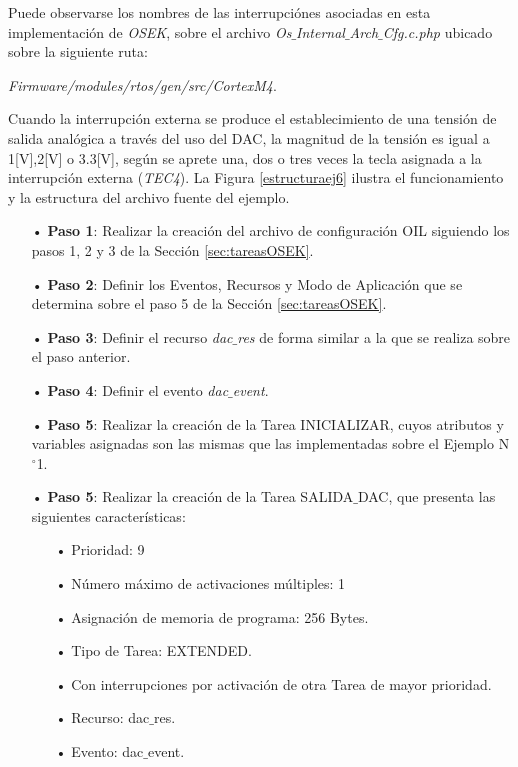 \documentclass[12pt,letterpaper]{article}
\begin{document}
Puede observarse los nombres de las interrupciónes asociadas en esta implementación de \textit{OSEK}, sobre el archivo \textit{Os$\_$Internal$\_$Arch$\_$Cfg.c.php} ubicado sobre la siguiente ruta:

{\footnotesize \textit{Firmware/modules/rtos/gen/src/CortexM4}}.

Cuando la interrupción externa se produce el establecimiento de una tensión de salida analógica a través del uso del DAC, la magnitud de la tensión es igual a 1[V],2[V] o 3.3[V], según se aprete una, dos o tres veces la tecla asignada a la interrupción externa (\textit{TEC4}). La Figura \ref{estructuraej6} ilustra el funcionamiento y la estructura del archivo fuente del ejemplo.

\begin{enumerate}
\item[•]\textbf{Paso 1}: Realizar la creación del archivo de configuración OIL siguiendo los pasos 1, 2 y 3 de la Sección \ref{sec:tareasOSEK}.
\item[•]\textbf{Paso 2}: Definir los Eventos, Recursos y Modo de Aplicación que se determina sobre el paso 5 de la Sección \ref{sec:tareasOSEK}.
\item[•]\textbf{Paso 3}: Definir el recurso \textit{dac$\_$res} de forma similar a la que se realiza sobre el paso anterior.
\item[•]\textbf{Paso 4}: Definir el evento \textit{dac$\_$event}.
\item[•]\textbf{Paso 5}: Realizar la creación de la Tarea INICIALIZAR, cuyos atributos y variables asignadas son las mismas que las implementadas sobre el Ejemplo N$^{\circ}$1.

\item[•]\textbf{Paso 5}: Realizar la creación de la Tarea SALIDA$\_$DAC, que presenta las siguientes características:
\begin{enumerate}
\item[•]Prioridad: 9
\item[•]Número máximo de activaciones múltiples: 1
\item[•]Asignación de memoria de programa: 256 Bytes.
\item[•]Tipo de Tarea: EXTENDED.
\item[•]Con interrupciones por activación de otra Tarea de mayor prioridad.
\item[•]Recurso: dac$\_$res.
\item[•]Evento: dac$\_$event.
\end{enumerate}


\end{enumerate}
\end{document}
